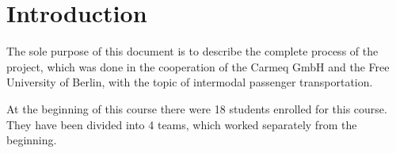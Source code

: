 \chapter{Introduction}\label{wo1}

The sole purpose of this document is to describe the complete process of the project, which was done in the cooperation of the
Carmeq GmbH and the Free University of Berlin, with the topic of intermodal passenger transportation.

At the beginning of this course there were 18 students enrolled for this course. They have been divided into 4 teams, which
worked separately from the beginning. 
